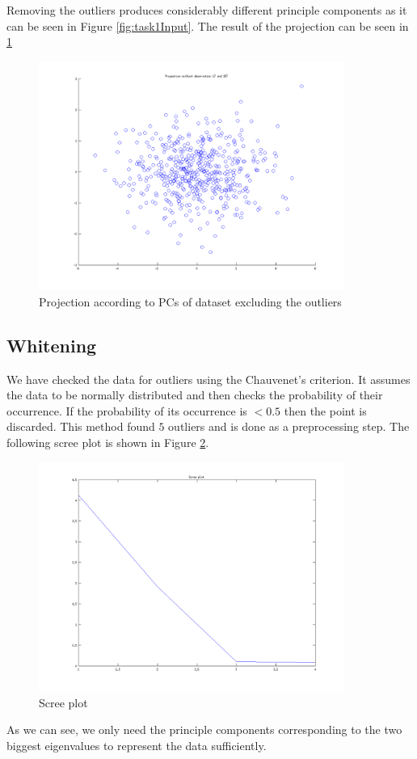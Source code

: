 \documentclass{article}
\begin{document}
		Removing the outliers produces considerably different principle components as it can be seen in Figure \ref{fig:task1Input}. The result of the projection can be seen in \ref{fig:task1ProjectionWithoutOutliers}
		\begin{figure}[H]
			\centering
			\includegraphics[width=10cm]{task1ProjectionWithoutOutliers.png}
			\caption{Projection according to PCs of dataset excluding the outliers}
			\label{fig:task1ProjectionWithoutOutliers}
		\end{figure}
	\subsection{Whitening}
		We have checked the data for outliers using the Chauvenet's criterion. 
		It assumes the data to be normally distributed and then checks the probability of their occurrence. 
		If the probability of its occurrence is $<0.5$ then the point is discarded.
		This method found $5$ outliers and is done as a preprocessing step.
		The following scree plot is shown in Figure \ref{fig:task2ScreePlot}.
		\begin{figure}[H]
			\centering
			\includegraphics[width=10cm]{task2ScreePlot.png}
			\caption{Scree plot}
			\label{fig:task2ScreePlot}
		\end{figure}
		As we can see, we only need the principle components corresponding to the two biggest eigenvalues to represent the data sufficiently.
		
\end{document}
